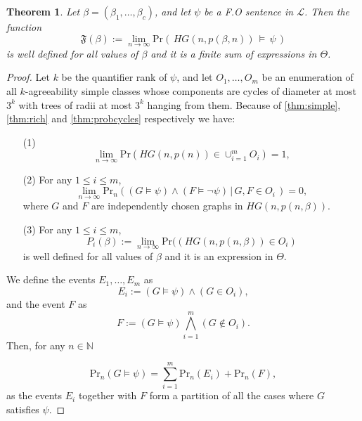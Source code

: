 \documentclass[11pt,notitlepage,a4paper]{article}
\newtheorem{theorem}{Theorem}[section]
\theoremstyle{definition}
\newcommand{\N}{\mathbb{N}}
\newcommand{\Ln}{\lim\limits_{n\to \infty}}
\begin{document}
\begin{theorem} 
	Let $\beta=(\beta_1,\dots, \beta_c)$, and let $\psi$ be a 
	F.O sentence in $\mathcal{L}$. Then the function
	\[
	\mathfrak{F}(\beta):=\Ln \mathrm{Pr}(\, HG(n,p(\beta,n))\, \models \, \psi \,)
	\]
	is well defined for all values of $\beta$ and it is a finite sum 
	of expressions in $\Theta$.
\end{theorem}
\begin{proof}
	Let $k$ be the quantifier rank of $\psi$, and
	let $O_1,\dots,O_m$ be an enumeration of all $k$-agreeability
	simple classes whose components are cycles of diameter at most $3^k$ with trees of radii at most $3^k$ hanging from them.
	Because of \cref{thm:simple},
	\cref{thm:rich} and \cref{thm:probcycles} respectively we have:
	\begin{itemize}
		\item[(1)] 
		\[ \Ln \mathrm{Pr}(HG(n,p(n))\in \cup_{i=1}^m O_i)=1,\]
		\item[(2)] For any $1\leq i \leq m$,
		\[\Ln \mathrm{Pr}_n((G\models \psi) \wedge
		 (F\models \neg \psi) \, | \, G,F\in O_i\,) = 0, \]
		 where $G$ and $F$ are independently chosen graphs in $HG(n,p(n,\beta))$.
		\item[(3)] For any $1\leq i \leq m$,
		\[ P_i(\beta):= \Ln \mathrm{Pr}((HG(n,p(n,\beta)) \in O_i)\]
		is well defined for all values of $\beta$ and it is an expression
		in $\Theta$.
	\end{itemize} 
 We define the events $E_1,\dots,E_{m}$ as
\[E_i:= (G \models \psi) \wedge (G \in O_i),\]
and the  event $F$ as
\[F:= (G \models \psi) \bigwedge_{i=1}^{m} (G \notin O_i).\]
Then, for any $n\in \N$

\begin{equation} \label{eqn:sumevents}
\mathrm{Pr}_n(G\models \psi) = \sum_{i=1}^{m} \mathrm{Pr}_n(E_i)  + \mathrm{Pr}_n(F),
\end{equation}
as the events $E_i$ together with $F$ form a partition of all the cases where $G$ satisfies $\psi$. \par


\end{proof}
\end{document}
